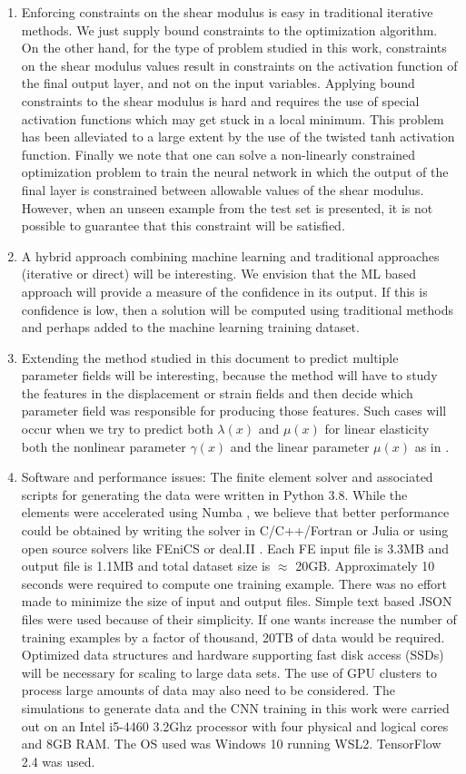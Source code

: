 \documentclass[12pt]{article}
\begin{document}
\begin{enumerate}
\item{Enforcing constraints on the shear modulus is easy in traditional iterative methods. We just supply bound constraints to the optimization algorithm. On the other hand, for the type of problem studied in this work, constraints on the shear modulus values result in constraints on the activation function of the final output layer, and not on the input variables. Applying bound constraints to the shear modulus is hard and requires the use of special activation functions which may get stuck in a local minimum. This problem has been alleviated to a large extent by the use of the twisted tanh activation function. Finally we note that one can solve a non-linearly constrained optimization problem to train the neural network in which the output of the final layer is constrained between allowable values of the shear modulus. However, when an unseen example from the test set is presented, it is not possible to guarantee that this constraint will be satisfied.}
\item{A hybrid approach combining machine learning and traditional approaches (iterative or direct) will be interesting. We envision that the ML based approach will provide a measure of the confidence in its output. If this is confidence is low, then a solution will be computed using traditional methods and perhaps added to the machine learning training dataset.}
\item{Extending the method studied in this document to predict multiple parameter fields will be interesting, because the method will have to study the features in the displacement or strain fields and then decide which parameter field was responsible for producing those features. Such cases will occur when we try to predict both $\lambda(x)$ and $\mu(x)$ for linear elasticity both the nonlinear parameter $\gamma(x)$ and the linear parameter $\mu(x)$ as in \cite{paper:gokhale2008}}.
\item{Software and performance issues: The finite element solver and associated scripts for generating the data were written in Python 3.8. While the elements were accelerated using Numba \cite{conf:numba}, we believe that better performance could be obtained by writing the solver in C/C++/Fortran or Julia or using open source solvers like FEniCS \cite{paper:fenics} or deal.II \cite{misc:deal.ii}. Each FE input file is 3.3MB and output file is 1.1MB and total dataset size is $\approx$  20GB. Approximately 10 seconds were required to compute one training example. There was no effort made to minimize the size of input and output files. Simple text based JSON files were used because of their simplicity. If one wants increase the number of training examples by a factor of thousand, 20TB of data would be required. Optimized data structures and hardware supporting fast disk access (SSDs) will be necessary for scaling to large data sets. The use of GPU clusters to process large amounts of data may also need to be considered. The simulations to generate data and the CNN training in this work were carried out on an Intel i5-4460 3.2Ghz processor with four physical and logical cores and 8GB RAM. The OS used was Windows 10 running WSL2. TensorFlow 2.4 was used.}
\end{enumerate}
\clearpage
{}

\appendix
\end{document}
